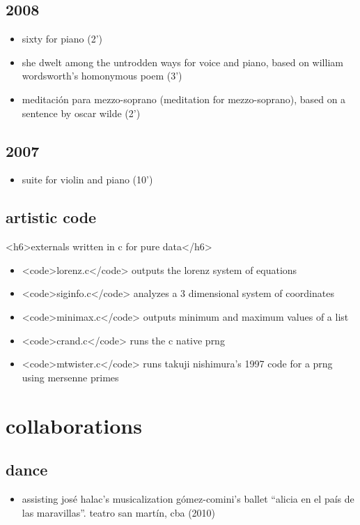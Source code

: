 \documentclass{book}
\begin{document}
\subsection{2008}
\begin{itemize}
\item sixty for piano (2’)
\item she dwelt among the untrodden ways for voice and piano, based on william wordsworth’s homonymous poem (3’)
\item meditación para mezzo-soprano (meditation for mezzo-soprano), based on a sentence by oscar wilde (2’)
\end{itemize}
\subsection{2007}
\begin{itemize}
\item suite for violin and piano (10’)
\end{itemize}

\subsection{artistic code}
<h6>externals written in c for pure data</h6>
\begin{itemize}
\item <code>lorenz.c</code> outputs the lorenz system of equations
\item <code>siginfo.c</code> analyzes a 3 dimensional system of coordinates
\item <code>minimax.c</code> outputs minimum and maximum values of a list
\item <code>crand.c</code> runs the c native prng
\item <code>mtwister.c</code> runs takuji nishimura's 1997 code for a prng using mersenne primes
\end{itemize}

\section{collaborations}
\subsection{dance}
\begin{itemize}
\item assisting josé halac’s musicalization gómez-comini’s ballet “alicia en el país de las maravillas”. teatro san martín, cba (2010)
\end{itemize}
\end{document}
